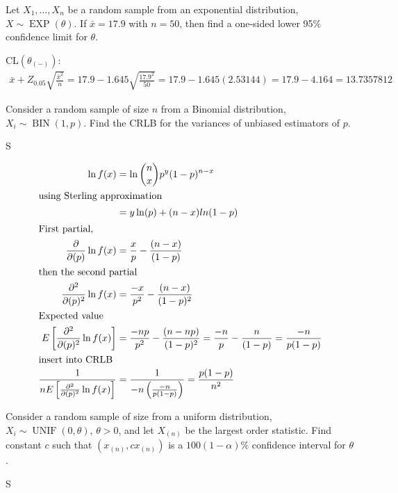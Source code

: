 \documentclass[answers]{exam}
\begin{document}
\begin{questions}
\question 
Let \(X_1,\ldots,X_n\) be a random sample from an exponential distribution,
\(X\sim\operatorname{EXP}(\theta)\). 
If \(\bar{x}=17.9\) with \(n=50\), then find a one-sided lower 95\%
confidence limit for \(\theta\).
\begin{solution}
	CL\((\theta_{(-)})\):
	\begin{align*}
		\bar{x} + Z_{0.05}\sqrt{\frac{\bar{x}^2}{n}} 
		= 17.9 - 1.645\sqrt{\frac{17.9^2}{50}} 
		= 17.9 - 1.645(2.53144)
		= 17.9 - 4.164%
		= 13.7357812
	\end{align*}
\end{solution}

\question 
Consider a random sample of size \(n\) from a Binomial distribution,
\(X_i\sim\operatorname{BIN}(1,p)\). 
Find the CRLB for the variances of unbiased estimators of \(p\).
\begin{solution}
	S
	
	\begin{align*}
		\ln f(x) &= \ln\binom{n}{x}p^y(1-p)^{n-x} \\
		\intertext{using Sterling approximation}
			&= y \ln(p) + (n-x)ln(1-p) \\
	\intertext{First partial,}
		\frac{\partial}{\partial(p)}\ln f(x) &= \frac{x}{p} -\frac{(n-x)}{(1-p)} \\
	\intertext{then the second partial}
		\frac{\partial^2}{\partial(p)^2}\ln f(x)
			&= \frac{-x}{p^2} -\frac{(n-x)}{(1-p)^2} \\
	\intertext{Expected value}
		E\left[\frac{\partial^2}{\partial(p)^2}\ln f(x)\right]
		&= \frac{-np}{p^2} -\frac{(n-np)}{(1-p)^2}
		= \frac{-n}{p} -\frac{n}{(1-p)} 
		= \frac{-n}{p(1-p)} \\
	\intertext{insert into CRLB}
		\frac{1}{nE\left[\frac{\partial^2}{\partial(p)^2}\ln f(x)\right]}
		&= \frac{1}{-n\left(\frac{-n}{p(1-p)}\right)}
		= \frac{p(1-p)}{n^2}
	\end{align*}
\end{solution}

\question 
Consider a random sample of size from a uniform distribution,
\(X_i\sim\operatorname{UNIF}(0,\theta)\), \(\theta>0\),
and let \(X_{(n)}\) be the largest order statistic. 
Find constant \(c\) such that \((x_{(n)},cx_{(n)})\) is a \(100(1-\alpha)\%\) 
confidence interval for \(\theta\).
\begin{solution}
	S
\end{solution}


\end{questions}
\end{document}
